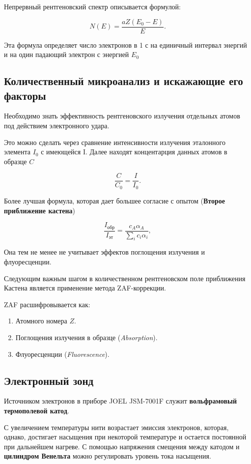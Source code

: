 \documentclass[12pt]{article}
\begin{document}
Непрервный рентгеновский спектр описывается формулой:

\[
N(E) = \frac{a Z (E_0 - E)}{E}.\tag{6}
\]

Эта формула определяет число электронов в 1 с на единичный интервал  энергий и на один падающий электрон с энергией $E_0$

\subsection{Количественный микроанализ и искажающие его факторы}

Необходимо знать эффективность 
рентгеновского излучения отдельных атомов под действием электронного 
удара.

Это можно сделать через сравнение интенсивности излучения эталонного элемента $I_0$ с имеющейся I. Далее находят концентарция данных атомов в образце $C$

\[
\frac{C}{C_0} = \frac{I}{I_0}.\tag{7}
\]

Более лучшая формула, которая дает большее согласие с опытом (\textbf{Второе приближение кастена})

\[
\frac{I_{\text{обр}}}{I_{\text{эт}}} = \frac{c_A \alpha_A}{\sum_i c_i \alpha_i},\tag{8}
\]

Она тем не менее не учитывает эффектов поглощения излучения и флуоресценции.


Следующим важным шагом в количественном рентгеновском поле приближения Кастена является применение метода ZAF-коррекции.

ZAF расшифровывается как:

\begin{enumerate}
    \item Атомного номера $Z$.
    \item Поглощения излучения в образце (\textit{Absorption}).
    \item Флуоресценции (\textit{Fluorescence}).
\end{enumerate}

\newpage

\subsection{Электронный зонд}

Источником электронов в приборе JOEL JSM-7001F служит \textbf{вольфрамовый термополевой катод}.


 
С увеличением температуры нити возрастает эмиссия электронов, которая, однако, достигает насыщения при некоторой температуре и остается постоянной при дальнейшем нагреве. С помощью напряжения смещения между катодом и \textbf{цилиндром Венельта} можно регулировать уровень 
тока насыщения. 
\end{document}
